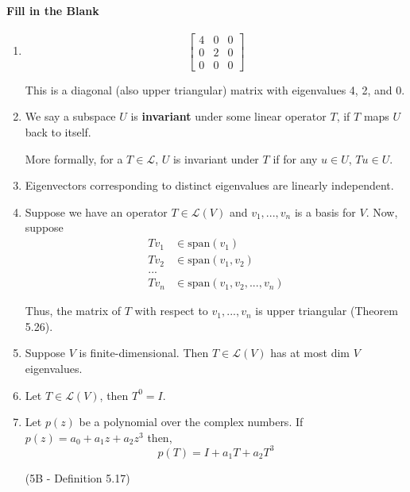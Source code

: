 \documentclass{article}
\newcommand{\spn}[1]{\text{span}\left(#1\right)}
\begin{document}
\paragraph{Fill in the Blank}
\begin{enumerate}
    \item
\[\begin{bmatrix}
    4 & 0 & 0 \\
    0 & 2 & 0 \\
    0 & 0 & 0
\end{bmatrix} \]

This is a diagonal (also upper triangular) matrix with eigenvalues 4, 2, and 0.

\item We say a subspace $U$ is \textbf{invariant} under some linear operator $T$, if $T$ maps $U$ back to itself.

More formally, for a $T \in \mathcal{L}$, $U$ is invariant under $T$ if for any $u \in U$, $Tu \in U$.

\item Eigenvectors corresponding to distinct eigenvalues are linearly independent.

\item Suppose we have an operator $T \in \mathcal{L}(V)$ and $v_1, ..., v_n$ is a basis for $V$. Now, suppose
\[\begin{aligned}
    Tv_1 &\in \spn{v_1} \\
    Tv_2 &\in \spn{v_1, v_2} \\
    ... \\
    Tv_n &\in \spn{v_1, v_2, ..., v_n}
\end{aligned}\]

Thus, the matrix of $T$ with respect to $v_1, ..., v_n$ is upper triangular (Theorem 5.26).

\item Suppose $V$ is finite-dimensional. Then $T \in \mathcal{L}(V)$ has at most dim $V$ eigenvalues.

\item Let $T \in \mathcal{L}(V)$, then $T^0 = I$.

\item Let $p(z)$ be a polynomial over the complex numbers. If
$p(z) = a_0 + a_1z + a_2z^3$ then,
\[ p(T) = I + a_1T + a_2T^3 \]

(5B - Definition 5.17)

\end{enumerate}
\end{document}

